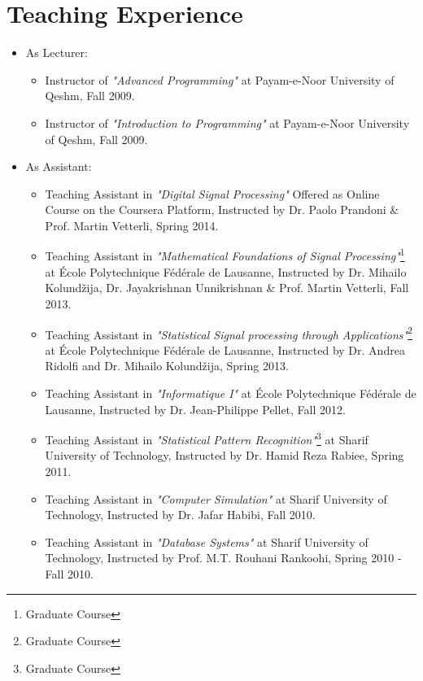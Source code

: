 \documentclass[a4paper]{article}
\theoremstyle{definition}
\begin{document}
\section{Teaching Experience}
\begin{itemize}
\item As Lecturer:

\begin{itemize}
	\item Instructor of \emph{"Advanced Programming"} at Payam-e-Noor University of Qeshm, Fall 2009.
	\item Instructor of \emph{"Introduction to Programming"} at Payam-e-Noor University of Qeshm, Fall 2009.
\end{itemize}
\item As Assistant:
\begin{itemize}
	\item Teaching Assistant in \emph{"Digital Signal Processing"} Offered as Online Course on the Coursera Platform, Instructed by Dr. Paolo Prandoni \& Prof. Martin Vetterli, Spring 2014.
	 \item Teaching Assistant in \emph{"Mathematical Foundations of Signal Processing"}\footnote{Graduate Course} at  \'{E}cole Polytechnique F\'{e}d\'{e}rale de Lausanne, Instructed by Dr. Mihailo Kolund\v{z}ija, Dr. Jayakrishnan Unnikrishnan \& Prof. Martin Vetterli, Fall 2013.
    \item Teaching Assistant in \emph{"Statistical Signal processing through Applications"}\footnote{Graduate Course} at  \'{E}cole Polytechnique F\'{e}d\'{e}rale de Lausanne, Instructed by Dr. Andrea Ridolfi and Dr. Mihailo Kolund\v{z}ija, Spring 2013.
	\item Teaching Assistant in \emph{"Informatique I"} at  \'{E}cole Polytechnique F\'{e}d\'{e}rale de Lausanne, Instructed by Dr. Jean-Philippe Pellet, Fall 2012.
	\item Teaching Assistant in \emph{"Statistical Pattern Recognition"}\footnote{Graduate Course} at Sharif University of Technology, Instructed by Dr. Hamid Reza Rabiee, Spring 2011.
	\item Teaching Assistant in \emph{"Computer Simulation"} at Sharif University of Technology, Instructed by Dr. Jafar Habibi, Fall 2010.
	\item Teaching Assistant in \emph{"Database Systems"} at Sharif University of Technology, Instructed by Prof. M.T. Rouhani Rankoohi, Spring 2010 - Fall 2010.

\end{itemize}
\end{itemize}
\end{document}
